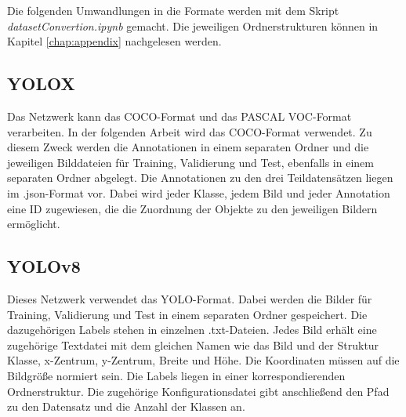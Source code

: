 Die folgenden Umwandlungen in die Formate werden mit dem Skript \textit{datasetConvertion.ipynb} gemacht. Die jeweiligen Ordnerstrukturen können in Kapitel \ref{chap:appendix} nachgelesen werden.


\subsection{YOLOX}
Das Netzwerk kann das COCO-Format und das PASCAL VOC-Format verarbeiten. In der folgenden Arbeit wird das COCO-Format verwendet. Zu diesem Zweck werden die Annotationen in einem separaten Ordner und die jeweiligen Bilddateien für Training, Validierung und Test, ebenfalls in einem separaten Ordner abgelegt. Die Annotationen zu den drei Teildatensätzen liegen im .json-Format vor. Dabei wird jeder Klasse, jedem Bild und jeder Annotation eine ID zugewiesen, die die Zuordnung der Objekte zu den jeweiligen Bildern ermöglicht. 



\subsection{YOLOv8}
Dieses Netzwerk verwendet das YOLO-Format. Dabei werden die Bilder für Training, Validierung und Test in einem separaten Ordner gespeichert. Die dazugehörigen Labels stehen in einzelnen .txt-Dateien. Jedes Bild erhält eine zugehörige Textdatei mit dem gleichen Namen wie das Bild und der Struktur Klasse, x-Zentrum, y-Zentrum, Breite und Höhe. Die Koordinaten müssen auf die Bildgröße normiert sein. Die Labels liegen in einer korrespondierenden Ordnerstruktur. Die zugehörige Konfigurationsdatei gibt anschließend den Pfad zu den Datensatz und die Anzahl der Klassen an. 



